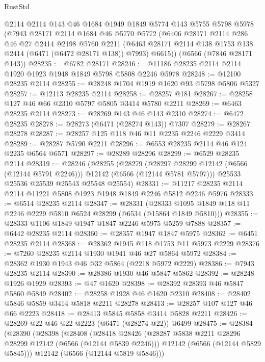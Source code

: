 \begin{lexlean}{RustStd}
\begin{coremodule}
{\begin{coremodule}
{{{{{{{{{{{{{{{{{{{{{{{{{{    @2114
    @2114
    @143
    @46
    @1684
    @1949
    @1849
    @5774
    @143
    @5755
    @5798
    @5978
    (@7943
      @28171
      @2114
      @1684
      @46
      @5770
      @5772
      (@6406
        @28171
        @2114
        @286
        @46
        @27
        @2414
        @2198
        @5760
        @2211
        (@6463 @28171 @2114 @138 @1753 @138 @2414 (@6471 (@6472 @28171 @138)) @7993)
        @6615))
    (@6566 (@7846 @28171 @143))
@28235 := @6782 @28171
@28246 := @11186 @28235 @2114 @2114 @1920 @1923 @1948 @1849 @5798 @5808 @2246 @5978
@28248 := @12100 @28235 @2114
@28255 := @28248 @1704 @1919 @1620 @93 @5798 @5806 @5327
@28257 := @12113 @28235 @2114
@28258 := @28257 @181
@28267 := @28258 @127 @46 @66 @2310 @5797 @5805 @3414 @5780 @2211
@28269 := @6463 @28235 @2114
@28273 := @28269 @143 @46 @143 @2310
@28274 := @6472 @28235
@28278 := @28273 (@6471 (@28274 @143)) @7307
@28279 := @28267 @28278
@28287 := @28257 @125 @118 @46 @11 @2235 @2246 @2229 @3414
@28289 := @28287 @5790 @2211
@28296 := @6553 @28235 @2114 @46 @124 @2235 @6564 @6571
@28297 := @28289 @28296
@28299 := @6529 @28235 @2114
@28319 := @28246
    (@28255
      (@28279
        (@28297 @28299 @12142 (@6566 (@12144 @5791 @2246)))
        @12142
        (@6566 (@12144 @5781 @5797)))
      @25533
      @25536
      @25539
      @25543
      @25548
      @25554)
@28331 := @11217 @28235 @2114 @2114 @11221 @5808 @1923 @1948 @1849 @2246 @5812 @2246 @5976
@28333 := @6514 @28235 @2114
@28347 := @28331
    (@28333 @1095 @1849 @118 @11 @2246 @2229 @5810 @6524 @28299 (@6534 (@15864 @1849 @5810)))
@28355 := @28333 @1106 @1849 @1947 @1847 @2246 @5975 @5259 @7888
@28357 := @6442 @28235 @2114
@28360 := @28357 @1947 @1847 @5975
@28362 := @6451 @28235 @2114
@28368 := @28362 @1945 @118 @1753 @11 @5973 @2229
@28376 := @7260 @28235 @2114 @1930 @1941 @46 @27 @5864 @5972
@28384 := @28362 @1930 @1943 @46 @32 @5864 (@2218 @5972 @2229)
@28386 := @7943 @28235 @2114
@28390 := @28386 @1930 @46 @5847 @5862
@28392 := @28248 @1926 @1929
@28393 := @47 @1620
@28398 := @28392 @28393 @46 @5847 @5860 @5849
@28402 := @28258 @1928 @46 @1620 @2310
@28408 := @28402 @5846 @5859 @3414 @5818 @2211 @28278
@28413 := @28257 @107 @127 @46 @66 @2223
@28418 := @28413 @5845 @5858 @3414 @5828 @2211
@28426 := @28269 @22 @46 @22 @2223 (@6471 (@28274 @22)) @6499
@28475 := @28384
    (@28390
      (@28398
        (@28408
          (@28418
            @28426
            (@28287 @5838 @2211 @28296 @28299 @12142 (@6566 (@12144 @5839 @2246)))
            @12142
            (@6566 (@12144 @5829 @5845)))
          @12142
          (@6566 (@12144 @5819 @5846)))
}}}}}}}}}}}}}}}}}}}}}}}}}}
\end{coremodule}}
\end{coremodule}
\end{lexlean}
